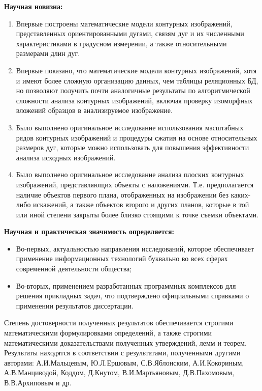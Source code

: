 \textbf{Научная новизна:}
\begin{enumerate}
\item Впервые построены математические модели контурных изображений, представленных ориентированными дугами, связям дуг и их численными характеристиками в градусном измерении,  а также  относительными размерами  длин дуг.  
\item Впервые  показано, что математические модели контурных изображений, хотя и имеют более сложную организацию данных, чем  таблицы реляционных БД, но позволяют получить почти аналогичные результаты по алгоритмической сложности  анализа контурных изображений, включая проверку изоморфных вложений образцов в анализируемое изображение.
\item Было выполнено оригинальное исследование использования масштабных рядов контурных изображений и процедуры сжатия на  основе относительных размеров дуг, которые можно использовать для повышения эффективности анализа исходных изображений.
\item Было выполнено оригинальное исследование анализа плоских контурных изображений, представляющих объекты с наложениями. Т.е. предполагается наличие объектов первого плана, отображенных на изображении без каких-либо искажений,  а также объектов второго и других планов, которые в той или иной степени закрыты более близко стоящими к точке съемки объектами.
\end{enumerate}

\noindent
\textbf{Научная и практическая значимость определяется:}
\begin{itemize}
\item Во-первых, актуальностью направления исследований, которое обеспечивает применение информационных технологий буквально во всех сферах современной деятельности общества;
\item Во-вторых, применением разработанных программных комплексов для решения прикладных задач, что подтверждено официальными справками о применении результатов диссертации.
\end{itemize}

Степень достоверности полученных результатов обеспечивается строгими математическими формулировками определений, а также строгими математическими доказательствами полученных утверждений, лемм и теорем.
Результаты находятся в соответствии с результатами, полученными другими авторами:  А.И.Мальцевым\cite{D12}, Ю.Л.Ершовым\cite{D12}, С.В.Яблонским\cite{D21}, А.И.Кокориным\cite{D10}, А.В.Манциводой\cite{D13},  Коддом\cite{D25}, Д.Кнутом\cite{D9}, В.И.Мартьяновым\cite{Samara}, Д.В.Пахомовым\cite{D16}, В.В.Архиповым\cite{D15} и др\cite{D1,D2,D3,D11}.

